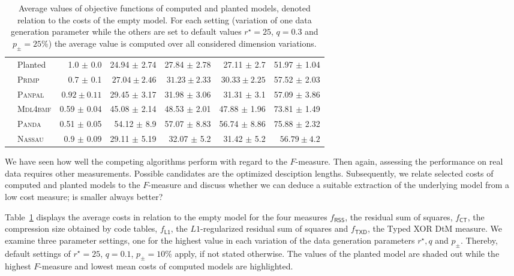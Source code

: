 \begin{table}
\begin{adjustbox}{max width=\textwidth}
\begin{tabular}{clrrrrr}
\rowcolor{black!10}
 \multirow{6}{*}{\cellcolor{white}\rotatebox{90}{ $q=0.3$ }  } 
&Planted &  1.0 $\pm$ 0.0  & 24.94 $\pm$ 2.74 & 27.84 $\pm$ 2.78 & 27.11 $\pm$ 2.7 & 51.97 $\pm$ 1.04\\
 & \textsc{Primp} & 0.7 $\pm$ 0.1  & $\mathbf{27.04\pm2.46}$ & $\mathbf{31.23\pm2.33}$ & $\mathbf{30.33\pm2.25}$ & 57.52 $\pm$ 2.03\\
 & \textsc{Panpal}  & $\mathbf{0.92\pm0.11}$ & 29.45 $\pm$ 3.17 & 31.98 $\pm$ 3.06 & 31.31 $\pm$ 3.1 & 57.09 $\pm$ 3.86\\
 & \textsc{Mdl4bmf} & 0.59 $\pm$ 0.04 & 45.08 $\pm$ 2.14 & 48.53 $\pm$ 2.01 & 47.88 $\pm$ 1.96 & 73.81 $\pm$ 1.49\\
 & \textsc{Panda} & 0.51 $\pm$ 0.05 & 54.12 $\pm$ 8.9 & 57.07 $\pm$ 8.83 & 56.74 $\pm$ 8.86 & 75.88 $\pm$ 2.32\\
 & \textsc{Nassau} & 0.9 $\pm$ 0.09 & 29.11 $\pm$ 5.19 & 32.07 $\pm$ 5.2 & 31.42 $\pm$ 5.2 & $\mathbf{56.79\pm4.2}$\\ 
 \bottomrule
\end{tabular}
\end{adjustbox}
\caption{Average values of objective functions of computed and planted models, denoted relation to the costs of the empty model. For each setting (variation of one data generation parameter while the others are set to default values $r^\star=25$, $q=0.3$ and $p_\pm=25\%$) the average value is computed over all considered dimension variations.}
\label{tbl:avgCosts}
\end{table}

We have seen how well the competing algorithms perform with regard to the $F$-measure. Then again, assessing the performance on real data requires other measurements. Possible candidates are the optimized desciption lengths. Subsequently, we relate selected costs of computed and planted models to the $F$-measure and discuss whether we can deduce a suitable extraction of the underlying model from a low cost measure; is smaller always better? 

Table~\ref{tbl:avgCosts} displays the average costs in relation to the empty model for the four measures $f_{\mathsf{RSS}}$, the residual sum of squares, $f_{\mathsf{CT}}$, the compression size obtained by code tables, $f_{\mathsf{L1}}$, the $L1$-regularized residual sum of squares and $f_{\mathsf{TXD}}$, the Typed XOR DtM measure. We examine three parameter settings, one for the highest value in each variation of the data generation parameters $r^\star, q$ and $p_\pm$. Thereby, default settings of $r^\star=25$, $q=0.1$, $p_\pm=10\%$ apply, if not stated otherwise. The values of the planted model are shaded out while the highest $F$-measure and lowest mean costs of computed models are highlighted. 

